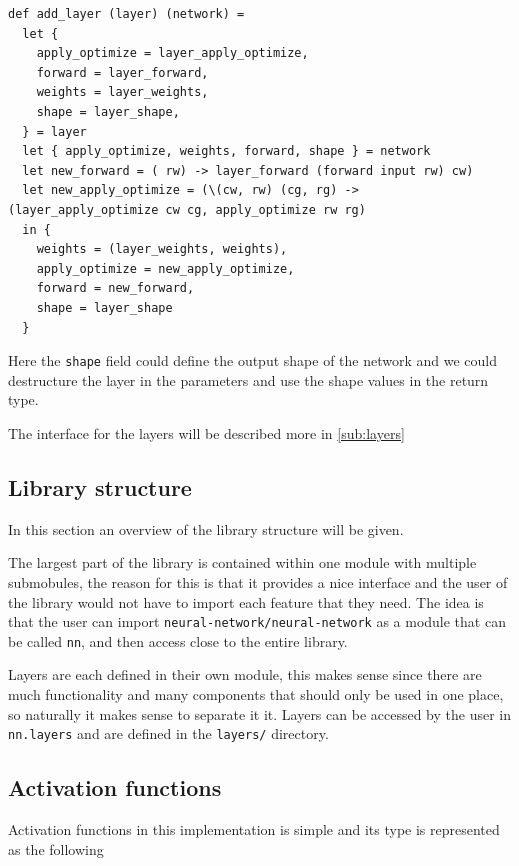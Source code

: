 \begin{lstlisting}[caption=the \texttt{add\_layer} function but with an added field \texttt{shape}.]
def add_layer (layer) (network) =
  let {
    apply_optimize = layer_apply_optimize,
    forward = layer_forward,
    weights = layer_weights,
    shape = layer_shape,
  } = layer
  let { apply_optimize, weights, forward, shape } = network
  let new_forward = ( rw) -> layer_forward (forward input rw) cw)
  let new_apply_optimize = (\(cw, rw) (cg, rg) -> (layer_apply_optimize cw cg, apply_optimize rw rg)
  in {
    weights = (layer_weights, weights),
    apply_optimize = new_apply_optimize,
    forward = new_forward,
    shape = layer_shape
  }
\end{lstlisting}

Here the \texttt{shape} field could define the output shape of the network and we could destructure the layer in the parameters and use the shape values in the return type.

The interface for the layers will be described more in \autoref{sub:layers}

\subsection{Library structure}

In this section an overview of the library structure will be given.

The largest part of the library is contained within one module with multiple submobules, the reason for this is that it provides a nice interface and the user of the library would not have to import each feature that they need.
The idea is that the user can import \texttt{neural-network/neural-network} as a module that can be called \texttt{nn}, and then access close to the entire library.

Layers are each defined in their own module, this makes sense since there are much functionality and many components that should only be used in one place, so naturally it makes sense to separate it it.
Layers can be accessed by the user in \texttt{nn.layers} and are defined in the \texttt{layers/} directory.

\subsection{Activation functions}

Activation functions in this implementation is simple and its type is represented as the following


